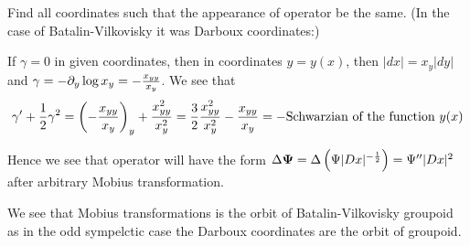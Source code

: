 Find all coordinates such that the appearance of operator be the same.
(In the case of Batalin-Vilkovisky it was Darboux coordinates:)

        If $\gamma=0$ in given coordinates, then in coordinates $y=y(x)$, then $|dx|=x_y|dy|$ and
        $\gamma=-\partial_y\log x_y=-{x_{yy}\over x_y}$. We see
         that
             $$
      \gamma'+{1\over 2}\gamma^2=\left(-{x_{yy}\over x_y}\right)_y+{x^2_{yy}\over x_y^2}=
 {3\over 2}{x^2_{yy}\over x_y^2}-{x_{yy}\over x_y}=-\hbox{Schwarzian of the function $y(x)$}
             $$

Hence we see that operator will have the form $ \Delta{\bf\Psi}=\Delta\left(\Psi|Dx|^{-{1\over 2}}\right)=\Psi''|Dx|^2$
 after arbitrary Mobius transformation.

 We see that Mobius transformations is the orbit of Batalin-Vilkovisky groupoid as
 in the odd sympelctic case the Darboux coordinates are the orbit of groupoid.



\bye
